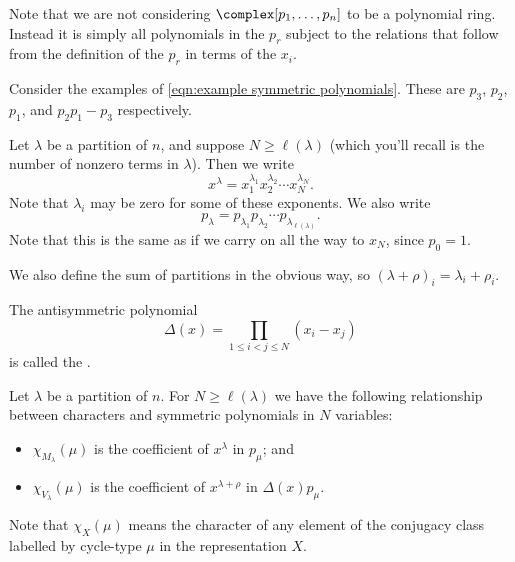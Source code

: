 \documentclass[fleqn]{NotesClass}
\begin{document}
    Note that we are not considering \(\complex[p_1, \dotsc, p_n]\) to be a polynomial ring.
    Instead it is simply all polynomials in the \(p_r\) subject to the relations that follow from the definition of the \(p_r\) in terms of the \(x_i\).
    
    Consider the examples of \cref{eqn:example symmetric polynomials}.
    These are \(p_3\), \(p_2\), \(p_1\), and \(p_2p_1 - p_3\) respectively.
    
    \begin{ntn}{}{}
        Let \(\lambda\) be a partition of \(n\), and suppose \(N \ge \ell(\lambda)\) (which you'll recall is the number of nonzero terms in \(\lambda\)).
        Then we write
        \begin{equation}
            x^\lambda = x_1^{\lambda_1} x_2^{\lambda_2} \dotsm x_N^{\lambda_N}.
        \end{equation}
        Note that \(\lambda_i\) may be zero for some of these exponents.
        We also write
        \begin{equation}
            p_{\lambda} = p_{\lambda_1} p_{\lambda_2} \dotsm p_{\lambda_{\ell(\lambda)}}.
        \end{equation}
        Note that this is the same as if we carry on all the way to \(x_N\), since \(p_0 = 1\).
        
        We also define the sum of partitions in the obvious way, so \((\lambda + \rho)_i = \lambda_i + \rho_i\).
        
        The antisymmetric polynomial
        \begin{equation}
            \Delta(x) = \prod_{1 \le i < j \le N} (x_i - x_j)
        \end{equation} 
        is called the .
    \end{ntn}
    
    \begin{prp}{}{}
        Let \(\lambda\) be a partition of \(n\).
        For \(N \ge \ell(\lambda)\) we have the following relationship between characters and symmetric polynomials in \(N\) variables:
        \begin{itemize}
            \item \(\chi_{M_\lambda}(\mu)\) is the coefficient of \(x^\lambda\) in \(p_\mu\); and
            \item \(\chi_{V_\lambda}(\mu)\) is the coefficient of \(x^{\lambda + \rho}\) in \(\Delta(x)p_\mu\).
        \end{itemize}
        Note that \(\chi_{X}(\mu)\) means the character of any element of the conjugacy class labelled by cycle-type \(\mu\) in the representation \(X\).
    \end{prp}
    
\end{document}
